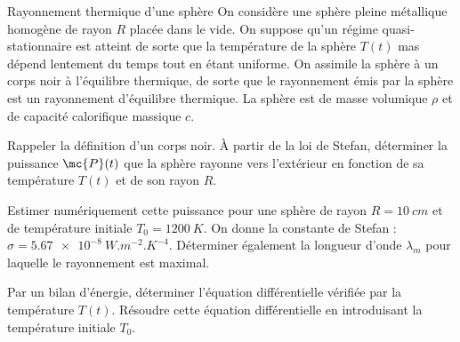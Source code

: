 \begin{exo}[PC][2][TD]{Rayonnement thermique d'une sphère}
On considère une sphère pleine métallique homogène de rayon $R$ placée dans le vide. On suppose qu'un régime quasi-stationnaire est atteint de sorte que la température de la sphère $T(t)$ mas dépend lentement du temps tout en étant uniforme. On assimile la sphère à un corps noir à l'équilibre thermique, de sorte que le rayonnement émis par la sphère est un rayonnement d'équilibre thermique. La sphère est de masse volumique $\rho$ et de capacité calorifique massique $c$.
\begin{quest}
  \item	Rappeler la définition d'un corps noir. À partir de la loi de Stefan, déterminer la puissance $\mc{P}(t)$ que la sphère rayonne vers l'extérieur en fonction de sa température $T(t)$ et de son rayon $R$.
  \item Estimer numériquement cette puissance pour une sphère de rayon $R=\SI{10}{cm}$ et de température initiale $T_0 = \SI{1200}{K}$. On donne la constante de Stefan : $\sigma=\SI{5,67e-8}{W.m^{-2}.K^{-4}}$. Déterminer également la longueur d'onde $\lambda_m$ pour laquelle le rayonnement est maximal.
  \item Par un bilan d'énergie, déterminer l'équation différentielle vérifiée par la température $T(t)$. Résoudre cette équation différentielle en introduisant la température initiale $T_0$.
\end{quest}
\end{exo}
